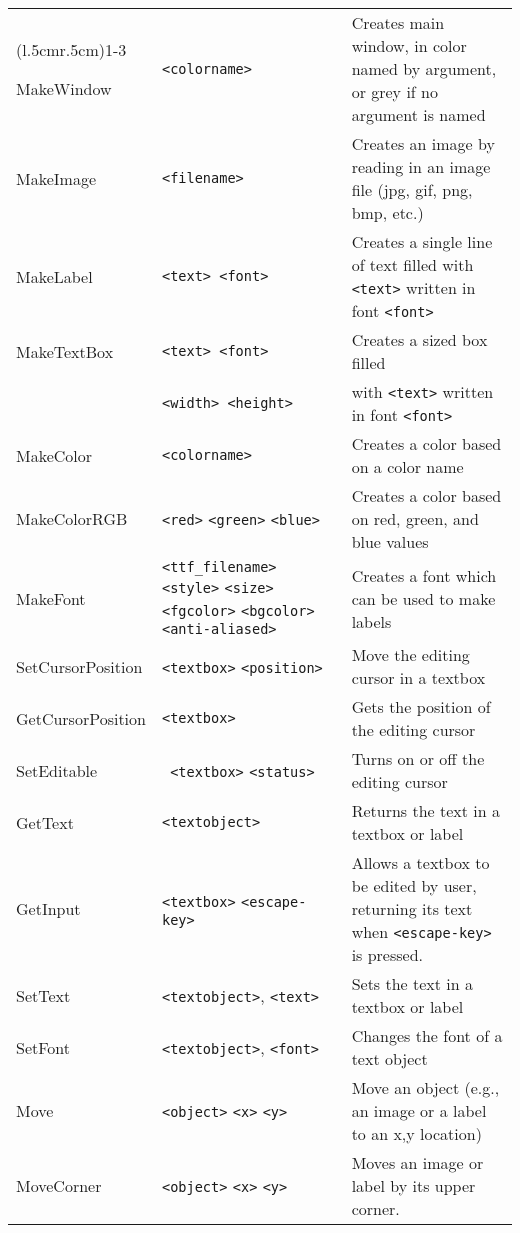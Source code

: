 \begin{longtable}{p{3cm}p{3cm}p{6cm}}
\addlinespace[0.2cm]
\midrule
\multicolumn{3}{c}{\textbf{Graphical Objects Functions}}\\
\cmidrule(l{.5cm}r{.5cm}){1-3}

MakeWindow     &\verb+<colorname>+ &Creates main window, in color named by argument, or grey if no argument is named\\
MakeImage      &\verb+<filename>+  &Creates an image by reading  in an image file (jpg, gif, png, bmp, etc.)\\
MakeLabel      &\verb+<text> <font>+&Creates a single line of text filled with \verb+<text>+ written in font \verb+<font>+\\
MakeTextBox    &\verb+<text> <font>+   &Creates a sized box filled  \\
	       &\verb+<width> <height>+&  with \verb+<text>+ written in font \verb+<font>+ \\
MakeColor      &\verb+<colorname>+       & Creates a color based on a color name\\
MakeColorRGB   &\verb+<red>+ \verb+<green>+ \verb+<blue>+ & Creates a color based on red, green, and blue values\\
MakeFont       &\verb+<ttf_filename>+ \verb+<style>+ \verb+<size>+ \verb+<fgcolor>+ \verb+<bgcolor>+ \verb+<anti-aliased>+&Creates a font which can be used to make labels \\
SetCursorPosition &\verb+<textbox>+ \verb+<position>+ &   Move the editing cursor in a textbox\\
GetCursorPosition &\verb+<textbox>+  &Gets the position of the editing cursor\\
SetEditable       &\verb+ <textbox>+ \verb+<status>+&     Turns on or off the editing cursor\\
GetText           &\verb+<textobject>+ &Returns the text in a textbox or label\\
GetInput          &\verb+<textbox>+ \verb+<escape-key>+& Allows a textbox to be edited by user, returning its text when \verb+<escape-key>+ is pressed.\\
SetText           &\verb+<textobject>+, \verb+<text>+ &Sets the text in a textbox or label\\
SetFont           &\verb+<textobject>+, \verb+<font>+ &Changes the font of a text object \\
Move              &\verb+<object>+ \verb+<x>+ \verb+<y>+& Move an object (e.g., an  image or  a label to an x,y location) \\
MoveCorner        &\verb+<object>+ \verb+<x>+ \verb+<y>+&    Moves an image or label by its upper corner.\\

\end{longtable}

